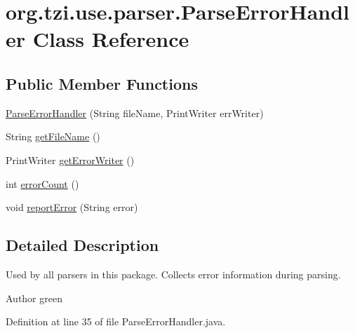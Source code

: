 \hypertarget{classorg_1_1tzi_1_1use_1_1parser_1_1_parse_error_handler}{\section{org.\-tzi.\-use.\-parser.\-Parse\-Error\-Handler Class Reference}
\label{classorg_1_1tzi_1_1use_1_1parser_1_1_parse_error_handler}
}
\subsection*{Public Member Functions}
\begin{DoxyCompactItemize}
\item 
\hyperlink{classorg_1_1tzi_1_1use_1_1parser_1_1_parse_error_handler_aadb6dc8aba193afb2a48398d85d3ecf3}{Parse\-Error\-Handler} (String file\-Name, Print\-Writer err\-Writer)
\item 
String \hyperlink{classorg_1_1tzi_1_1use_1_1parser_1_1_parse_error_handler_a22634fe07a12385e50411cc500cd5ba6}{get\-File\-Name} ()
\item 
Print\-Writer \hyperlink{classorg_1_1tzi_1_1use_1_1parser_1_1_parse_error_handler_aed0e90f7586b92f8e5e8bc38a262e5fe}{get\-Error\-Writer} ()
\item 
int \hyperlink{classorg_1_1tzi_1_1use_1_1parser_1_1_parse_error_handler_a3cc0bfd28272c181112cfa91aeff333e}{error\-Count} ()
\item 
void \hyperlink{classorg_1_1tzi_1_1use_1_1parser_1_1_parse_error_handler_a1412c9df3870ef744fa576128ff8d6d3}{report\-Error} (String error)
\end{DoxyCompactItemize}


\subsection{Detailed Description}
Used by all parsers in this package. Collects error information during parsing.

\begin{DoxyAuthor}{Author}
green 
\end{DoxyAuthor}


Definition at line 35 of file Parse\-Error\-Handler.\-java.



